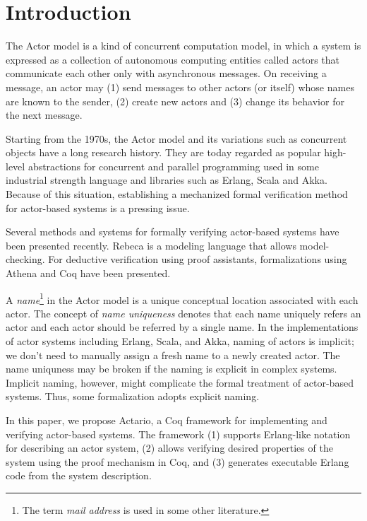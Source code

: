 \section{Introduction}
\label{sec:introduction}


The Actor model\cite{Agha:1986aa} is a kind of concurrent computation
model, in which a system is expressed as a collection of autonomous
computing entities called actors that communicate each other only with
asynchronous messages.
On receiving a message, an actor may (1)
send messages to other actors (or itself) whose names are known to the
sender, (2) create new actors and (3) change its behavior for the next
message.

Starting from the 1970s, the Actor model and its variations such as
concurrent objects\cite{Yonezawa:1986aa} have a long research
history. They are today regarded as popular high-level abstractions
for concurrent and parallel programming used in some industrial
strength language and libraries such as Erlang\cite{Erlang},
Scala\cite{Scala} and Akka\cite{Akka}.  Because of this situation,
establishing a mechanized formal verification method for actor-based
systems is a pressing issue.

Several methods and systems for formally verifying actor-based systems
have been presented recently. Rebeca\cite{Sirjani:2011aa} is a
modeling language that allows model-checking.  For deductive
verification using proof assistants, formalizations using
Athena\cite{Musser:2013aa} and Coq\cite{Garnock-Jones:2014aa} have
been presented.

A \emph{name}\footnote{The term \emph{mail address} is used in some other
  literature.} in the Actor model is a unique conceptual location
associated with each actor.  The concept of \emph{name uniqueness}
denotes that each name uniquely refers an actor and each actor should
be referred by a single name.  In the implementations of actor systems
including Erlang, Scala, and Akka, naming of actors is implicit; we
don't need to manually assign a fresh name to a newly created actor.
The name uniquness may be broken if the naming is explicit in complex
systems.  Implicit naming, however, might complicate the formal
treatment of actor-based systems. Thus, some formalization adopts
explicit naming.


In this paper, we propose Actario\cite{Actario}, a Coq framework for
implementing and verifying actor-based systems.  The framework (1)
supports Erlang-like notation for describing an actor system, (2)
allows verifying desired properties of the system using the proof
mechanism in Coq, and (3) generates executable Erlang code from the
system description.

